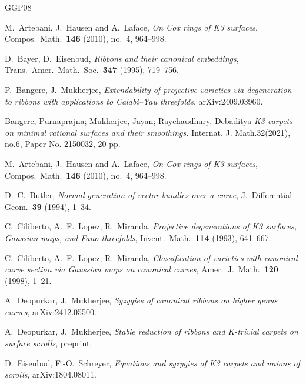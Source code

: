 \documentclass[11pt,reqno]{amsart}
\theoremstyle{plain}
\theoremstyle{definition}
\begin{document}
\begin{thebibliography}{GGP08}

 M.~Artebani, J.~Hausen and A.~Laface, \emph{On Cox rings of K3 surfaces}, Compos.\ Math.\ \textbf{146} (2010), no.~4, 964--998.

 D.~Bayer, D.~Eisenbud, \emph{Ribbons and their canonical embeddings}, Trans.\ Amer.\ Math.\ Soc.\ \textbf{347} (1995), 719--756.

 P.~Bangere, J.~Mukherjee, \emph{Extendability of projective varieties via degeneration to ribbons with applications to Calabi--Yau threefolds}, arXiv:2409.03960.


Bangere, Purnaprajna; Mukherjee, Jayan; Raychaudhury, Debaditya
\emph{K3 carpets on minimal rational surfaces and their smoothings.}
Internat. J. Math.32(2021), no.6, Paper No. 2150032, 20 pp.

 M.~Artebani, J.~Hausen and A.~Laface, \emph{On Cox rings of K3 surfaces}, Compos.\ Math.\ \textbf{146} (2010), no.~4, 964--998.

 D.~C.~Butler, \emph{Normal generation of vector bundles over a curve}, J.\ Differential Geom.\ \textbf{39} (1994), 1--34.

 C.~Ciliberto, A.~F.~Lopez, R.~Miranda, \emph{Projective degenerations of K3 surfaces, Gaussian maps, and Fano threefolds}, Invent.\ Math.\ \textbf{114} (1993), 641--667.

 C.~Ciliberto, A.~F.~Lopez, R.~Miranda, \emph{Classification of varieties with canonical curve section via Gaussian maps on canonical curves}, Amer.\ J.\ Math.\ \textbf{120} (1998), 1--21.

 A.~Deopurkar, J.~Mukherjee, \emph{Syzygies of canonical ribbons on higher genus curves}, arXiv:2412.05500.

 A.~Deopurkar, J.~Mukherjee, \emph{Stable reduction of ribbons and K-trivial carpets on surface scrolls}, preprint.

 D.~Eisenbud, F.-O.~Schreyer, \emph{Equations and syzygies of K3 carpets and unions of scrolls}, arXiv:1804.08011.


\end{thebibliography}
\end{document}
